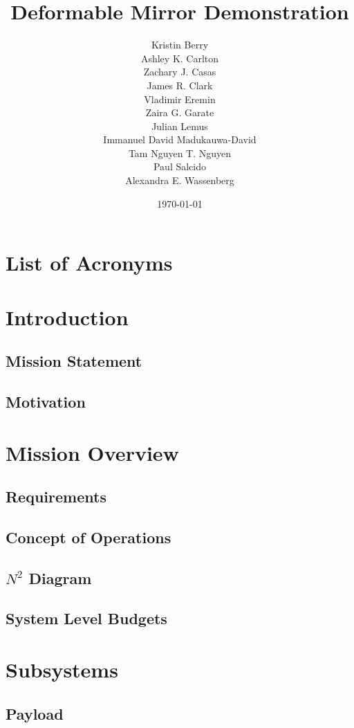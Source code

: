 \documentclass[12pt]{article}
\title{Deformable Mirror Demonstration}
\author{Kristin Berry\\
Ashley K. Carlton\\
Zachary J. Casas\\
James R. Clark\\
Vladimir Eremin\\ 
Zaira G. Garate\\ 
Julian Lemus\\
Immanuel David Madukauwa-David\\
Tam Nguyen T. Nguyen\\
Paul Salcido\\
Alexandra E. Wassenberg 
}
\date{\today}
\begin{document}
\maketitle
\newpage

\tableofcontents
\listoffigures
\listoftables


\section*{List of Acronyms}
\begin{acronym}


\end{acronym}
\newpage

\section{Introduction}
		\subsection{Mission Statement}
		\subsection{Motivation}
\section{Mission Overview}
		\subsection{Requirements}
		\subsection{Concept of Operations}
		\subsection{$N^2$ Diagram}
		\subsection{System Level Budgets}
\section{Subsystems}
		\subsection{Payload}
\end{document}
